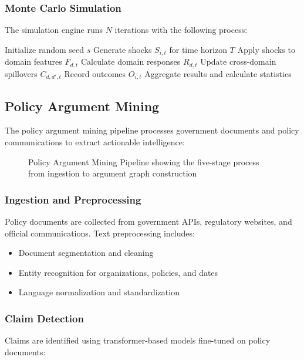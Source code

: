 \documentclass[conference]{IEEEtran}
\begin{document}
\subsubsection{Monte Carlo Simulation}
The simulation engine runs $N$ iterations with the following process:

\begin{algorithmic}
\STATE Initialize random seed $s$
    \STATE Generate shocks $S_{i,t}$ for time horizon $T$
    \STATE Apply shocks to domain features $F_{d,t}$
    \STATE Calculate domain responses $R_{d,t}$
    \STATE Update cross-domain spillovers $C_{d,d',t}$
    \STATE Record outcomes $O_{i,t}$
\ENDFOR
\STATE Aggregate results and calculate statistics
\end{algorithmic}

\subsection{Policy Argument Mining}

The policy argument mining pipeline processes government documents and policy communications to extract actionable intelligence:

\begin{figure}[H]
\centering
{}
\caption{Policy Argument Mining Pipeline showing the five-stage process from ingestion to argument graph construction}
\label{fig:argument_pipeline}
\end{figure}

\subsubsection{Ingestion and Preprocessing}
Policy documents are collected from government APIs, regulatory websites, and official communications. Text preprocessing includes:
\begin{itemize}
    \item Document segmentation and cleaning
    \item Entity recognition for organizations, policies, and dates
    \item Language normalization and standardization
\end{itemize}

\subsubsection{Claim Detection}
Claims are identified using transformer-based models fine-tuned on policy documents:
\end{document}
